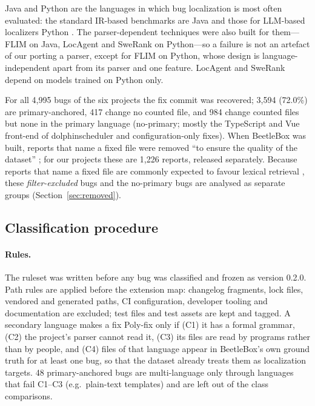\documentclass[a4paper,fleqn]{cas-dc}
\begin{document}
Java and Python are the languages in which bug localization is most often
evaluated: the
standard IR-based benchmarks are Java \citep{lee2018bench4bl,ye2014learning}
and those for LLM-based localizers Python \citep{jimenez2023swe}. The
parser-dependent techniques were also built for them---FLIM on Java,
LocAgent and SweRank on Python---so a failure is not an artefact of our
porting a parser, except for FLIM on Python, whose design is
language-independent apart from its parser and one feature. LocAgent and
SweRank depend on models trained on Python only.

For all 4{,}995 bugs of the six projects the fix commit was recovered;
3{,}594 (72.0\%) are primary-anchored, 417 change no counted file, and 984
change counted files but none in the primary language (no-primary; mostly the
TypeScript and Vue front-end of dolphinscheduler and configuration-only
fixes). When BeetleBox was built, reports that name a fixed file were removed
``to ensure the quality of the dataset'' \citep{chakraborty2025blaze}; for our
projects these are 1{,}226 reports, released separately. Because reports that
name a fixed file are commonly expected to favour lexical retrieval
\citep{kochhar2014potential}, these \emph{filter-excluded}
bugs and the no-primary bugs are analysed as separate groups
(Section~\ref{sec:removed}).

\subsection{Classification procedure}\label{sec:classification}

\paragraph{Rules.} The ruleset was written before any bug was classified and
frozen as version 0.2.0. Path rules are applied before the extension map:
changelog fragments, lock files, vendored and generated paths, CI
configuration, developer tooling and documentation are excluded; test files
and test assets are kept and tagged. A secondary language makes a fix Poly-fix
only if (C1) it has a formal grammar, (C2) the project's parser cannot read
it, (C3) its files are read by programs rather than by people, and (C4) files
of that language appear in BeetleBox's own ground truth for at least one bug,
so that the dataset already treats them as localization targets. 48
primary-anchored bugs are multi-language only through languages that fail
C1--C3 (e.g.\ plain-text templates) and are left out of the class comparisons.
\end{document}
